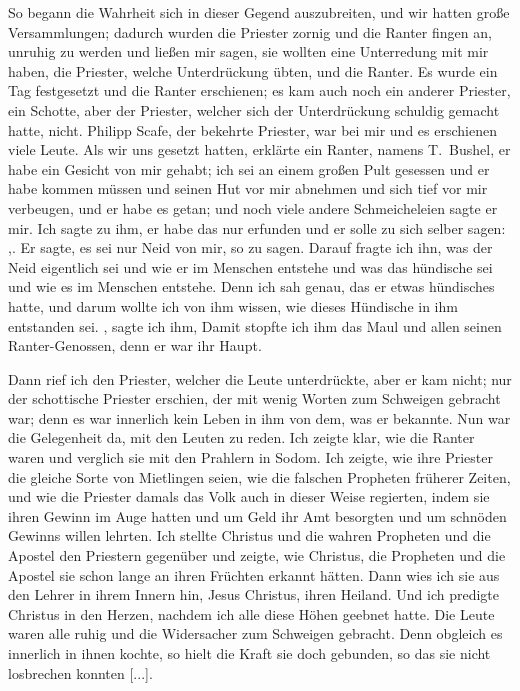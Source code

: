 So begann die Wahrheit sich in dieser Gegend auszubreiten, und
wir hatten große Versammlungen; dadurch wurden die Priester
zornig und die Ranter fingen an, 
unruhig zu werden und ließen
mir sagen, sie wollten eine 
Unterredung 
mit mir haben, die Priester,
welche Unterdrückung übten, und die Ranter. Es wurde ein Tag
festgesetzt und die Ranter erschienen; es kam auch noch ein anderer
Priester, ein Schotte, aber der Priester, welcher sich der 
Unterdrückung schuldig gemacht hatte, nicht. 
Philipp Scafe, der 
bekehrte Priester, war bei mir und es erschienen viele Leute. Als
wir uns gesetzt hatten, erklärte ein Ranter, namens 
T.~Bushel,
er habe ein Gesicht von mir gehabt; ich sei an einem großen Pult
gesessen und er habe kommen müssen und seinen Hut vor mir
abnehmen und sich tief vor mir verbeugen, und er habe es getan;
und noch viele andere Schmeicheleien sagte er mir. Ich sagte
zu ihm, er habe das nur erfunden und er solle zu sich selber
sagen: ,. 
Er sagte, es sei nur Neid von
mir, so zu sagen. Darauf fragte ich ihn, was der Neid eigentlich
sei und wie er im Menschen entstehe und was das hündische sei
und wie es im Menschen entstehe. Denn ich sah genau, das er
etwas hündisches hatte, und 
darum wollte ich von ihm wissen,
wie dieses Hündische in ihm entstanden sei. , sagte ich
ihm,  Damit stopfte ich ihm das Maul und allen seinen 
Ranter-Genossen, denn er war ihr Haupt. 

Dann rief ich den Priester,
welcher die Leute unterdrückte, aber er kam nicht; nur der schottische
Priester erschien, der mit wenig Worten zum Schweigen gebracht
war; denn es war innerlich kein Leben in ihm von dem, was er
bekannte. Nun war die Gelegenheit da, mit den Leuten zu reden.
Ich zeigte klar, wie die Ranter waren und verglich sie mit den
Prahlern in Sodom. Ich zeigte, wie ihre Priester die gleiche
Sorte von Mietlingen seien, wie die falschen Propheten früherer
Zeiten, und wie die Priester damals das Volk auch in dieser
Weise regierten, indem sie ihren Gewinn im Auge hatten und
um Geld ihr Amt besorgten und um schnöden Gewinns willen
lehrten. Ich stellte Christus und die wahren Propheten und die
Apostel den Priestern gegenüber und zeigte, wie Christus, die
Propheten und die Apostel sie schon lange an ihren Früchten
erkannt hätten. Dann wies ich sie aus den Lehrer in ihrem
Innern hin, Jesus Christus, ihren Heiland. Und ich predigte
Christus in den Herzen, nachdem ich alle diese Höhen geebnet
hatte. Die Leute waren alle ruhig und die Widersacher zum
Schweigen gebracht. Denn obgleich es innerlich in ihnen kochte,
so hielt die Kraft sie doch gebunden, so das sie nicht losbrechen
konnten [...].

